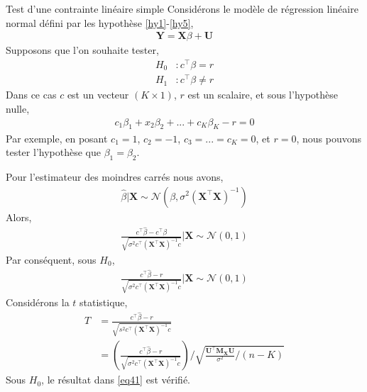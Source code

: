 \begin{frame}[allowframebreaks]{Test d'une contrainte linéaire simple}
Considérons le modèle de régression linéaire normal défini par les hypothèse \ref{hy1}-\ref{hy5},
\begin{align*}
\mathbf{Y} = \mathbf{X}\beta + \mathbf{U}
\end{align*}
Supposons que l'on souhaite tester,
\begin{align*}
H_0&: c^\top\beta=r\\
H_1&: c^\top\beta \neq r
\end{align*}
Dans ce cas $c$ est un vecteur $(K\times 1)$, $r$ est un scalaire, et sous l'hypothèse nulle,
\begin{align*}
c_1\beta_1 + x_2\beta_2+...+c_K\beta_K-r=0
\end{align*}
Par exemple, en posant $c_1 = 1$, $c_2=-1$, $c_3 = ...=c_K = 0$, et $r = 0$, nous pouvons tester l'hypothèse que $\beta_1=\beta_2$.

\medskip

Pour l'estimateur des moindres carrés nous avons,
\begin{align}
\widehat{\beta}|\mathbf{X} \sim \mathcal{N}\left(\beta, \sigma^2(\mathbf{X}^\top\mathbf{X})^{-1}\right)
\label{eq39}
\end{align} 
Alors,
\begin{align}
\frac{c^\top\widehat{\beta} - c^\top\beta}{\sqrt{\sigma^2c^\top(\mathbf{X}^\top\mathbf{X})^{-1}c}}
| \mathbf{X} \sim \mathcal{N}(0, 1)
\label{eq40}
\end{align} 
Par conséquent, sous $H_0$,
\begin{align}
\frac{c^\top\widehat{\beta} - r}
{\sqrt{\sigma^2c^\top(\mathbf{X}^\top\mathbf{X})^{-1}c}}
| \mathbf{X} \sim \mathcal{N}(0, 1)
\label{eq41}
\end{align} 
Considérons la $t$ statistique,
\begin{align*}
T &= \frac{c^\top\widehat{\beta} - r}
{\sqrt{s^2c^\top(\mathbf{X}^\top\mathbf{X})^{-1}c}}\\
&=\left(
\frac{c^\top\widehat{\beta} - r}
{\sqrt{\sigma^2c^\top(\mathbf{X}^\top\mathbf{X})^{-1}c}}
\right)
/
\sqrt{\frac{\mathbf{U}^\top\mathbf{M}_\mathbf{X}\mathbf{U}}{\sigma^2}/(n-K)}
\end{align*}
Sous $H_0$, le résultat dans \eqref{eq41} est vérifié. 

\medskip


\end{frame}
